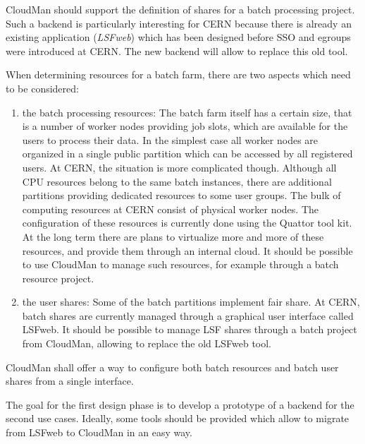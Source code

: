 CloudMan should support the definition of shares for a batch processing project. 
Such a backend is particularly interesting for CERN because there is already an
existing application ({\it LSFweb}) which has been designed before SSO and 
egroups were introduced at CERN. The new backend will allow to replace this old 
tool. 

When determining resources for a batch farm, there are two aspects which need
to be considered:

\begin{enumerate}
\item the batch processing resources: The batch farm itself has a certain size, that is a number of worker nodes providing job slots, which are available for the users to process their data. In the simplest case all worker nodes are organized in a single public partition which can be accessed by all registered users. At CERN, the situation is more complicated though. Although all CPU resources belong to the same batch instances, there are additional partitions providing dedicated resources to some user groups. 
The bulk of computing resources at CERN consist of physical worker nodes. The configuration of these resources is currently done using the Quattor tool kit. At the long term there are plans to virtualize more and more of these resources, and provide them through an internal cloud. It should be possible to use CloudMan to manage such resources, for example through a batch resource project. 
 
\item the user shares: Some of the batch partitions implement fair share. At CERN, batch shares are currently managed through a graphical user interface called
LSFweb. It should be possible to manage LSF shares through a batch project from CloudMan, allowing to replace the old LSFweb tool.
\end{enumerate}

CloudMan shall offer a way to configure both batch resources and batch user shares from a single interface. 

The goal for the first design phase is to develop a prototype of a backend for the second use cases. Ideally, some tools should be provided which allow to migrate from LSFweb to CloudMan in an easy way.
